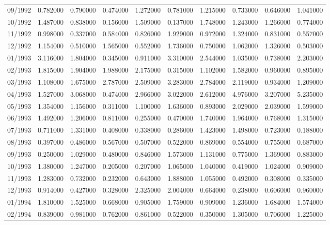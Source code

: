 \begin{tabular}{lrrrrrrrrr}
09/1992 & 0.782000 & 0.790000 & 0.474000 & 1.272000 & 0.781000 & 1.215000 & 0.733000 & 0.646000 & 1.041000 \\
10/1992 & 1.487000 & 0.838000 & 0.156000 & 1.509000 & 0.137000 & 1.748000 & 1.243000 & 1.266000 & 0.774000 \\
11/1992 & 0.998000 & 0.337000 & 0.584000 & 0.826000 & 1.929000 & 0.972000 & 1.324000 & 0.831000 & 0.557000 \\
12/1992 & 1.154000 & 0.510000 & 1.565000 & 0.552000 & 1.736000 & 0.750000 & 1.062000 & 1.326000 & 0.503000 \\
01/1993 & 3.116000 & 1.804000 & 0.345000 & 0.911000 & 3.310000 & 2.544000 & 1.035000 & 0.738000 & 2.203000 \\
02/1993 & 1.815000 & 1.904000 & 1.988000 & 2.175000 & 0.315000 & 1.102000 & 1.582000 & 0.960000 & 0.895000 \\
03/1993 & 1.108000 & 1.675000 & 2.787000 & 2.509000 & 3.283000 & 2.784000 & 2.119000 & 0.934000 & 1.209000 \\
04/1993 & 1.527000 & 3.068000 & 0.474000 & 2.966000 & 3.022000 & 2.612000 & 4.976000 & 3.207000 & 5.235000 \\
05/1993 & 1.354000 & 1.156000 & 0.311000 & 1.100000 & 1.636000 & 0.893000 & 2.029000 & 2.039000 & 1.599000 \\
06/1993 & 1.492000 & 1.206000 & 0.811000 & 0.255000 & 0.470000 & 1.740000 & 1.964000 & 0.768000 & 1.315000 \\
07/1993 & 0.711000 & 1.331000 & 0.408000 & 0.338000 & 0.286000 & 1.423000 & 1.498000 & 0.723000 & 0.188000 \\
08/1993 & 0.397000 & 0.486000 & 0.567000 & 0.507000 & 0.522000 & 0.869000 & 0.554000 & 0.755000 & 0.687000 \\
09/1993 & 0.250000 & 1.029000 & 0.480000 & 0.846000 & 1.573000 & 1.131000 & 0.775000 & 1.369000 & 0.883000 \\
10/1993 & 1.380000 & 1.247000 & 0.205000 & 0.207000 & 1.065000 & 1.040000 & 0.419000 & 1.024000 & 0.909000 \\
11/1993 & 1.283000 & 0.732000 & 0.232000 & 0.643000 & 1.888000 & 1.055000 & 0.492000 & 0.308000 & 0.335000 \\
12/1993 & 0.914000 & 0.427000 & 0.328000 & 2.325000 & 2.004000 & 0.664000 & 0.238000 & 0.606000 & 0.960000 \\
01/1994 & 1.810000 & 1.525000 & 0.668000 & 0.905000 & 1.759000 & 0.909000 & 1.236000 & 1.684000 & 1.574000 \\
02/1994 & 0.839000 & 0.981000 & 0.762000 & 0.861000 & 0.522000 & 0.350000 & 1.305000 & 0.706000 & 1.225000 \\

\end{tabular}
